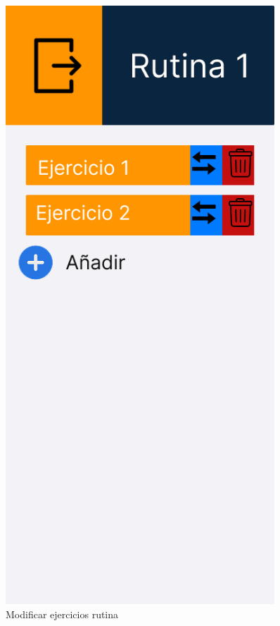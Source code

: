 \begin{figure}[H]
   \centering
   \begin{minipage}{0.45\textwidth}
      \centering
      \includegraphics[width=0.9\textwidth]{fotos/Frame 50.png}
      \caption{Modificar ejercicios rutina}

\end{minipage}
\end{figure}
